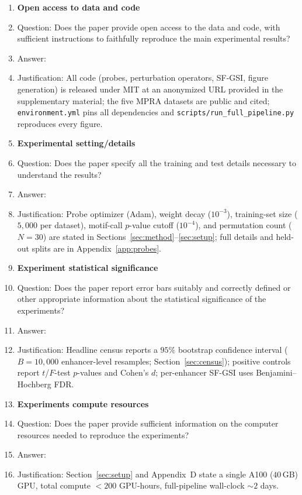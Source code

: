 \begin{enumerate}
\item {\bf Open access to data and code}
    \item[] Question: Does the paper provide open access to the data and code, with sufficient instructions to faithfully reproduce the main experimental results?
    \item[] Answer: \answerYes{}
    \item[] Justification: All code (probes, perturbation operators, SF-GSI, figure generation) is released under MIT at an anonymized URL provided in the supplementary material; the five MPRA datasets are public and cited; \texttt{environment.yml} pins all dependencies and \texttt{scripts/run\_full\_pipeline.py} reproduces every figure.

\item {\bf Experimental setting/details}
    \item[] Question: Does the paper specify all the training and test details necessary to understand the results?
    \item[] Answer: \answerYes{}
    \item[] Justification: Probe optimizer (Adam), weight decay ($10^{-3}$), training-set size ($5{,}000$ per dataset), motif-call $p$-value cutoff ($10^{-4}$), and permutation count ($N=30$) are stated in Sections~\ref{sec:method}--\ref{sec:setup}; full details and held-out splits are in Appendix~\ref{app:probes}.

\item {\bf Experiment statistical significance}
    \item[] Question: Does the paper report error bars suitably and correctly defined or other appropriate information about the statistical significance of the experiments?
    \item[] Answer: \answerYes{}
    \item[] Justification: Headline census reports a $95\%$ bootstrap confidence interval ($B=10{,}000$ enhancer-level resamples; Section~\ref{sec:census}); positive controls report $t$/$F$-test $p$-values and Cohen's $d$; per-enhancer SF-GSI uses Benjamini--Hochberg FDR.

\item {\bf Experiments compute resources}
    \item[] Question: Does the paper provide sufficient information on the computer resources needed to reproduce the experiments?
    \item[] Answer: \answerYes{}
    \item[] Justification: Section~\ref{sec:setup} and Appendix~D state a single A100 ($40$\,GB) GPU, total compute $<200$ GPU-hours, full-pipeline wall-clock $\sim 2$ days.


\end{enumerate}
